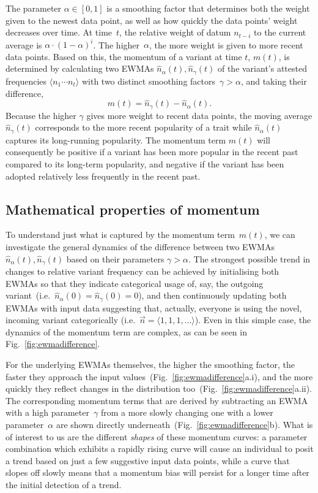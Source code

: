 \documentclass[10pt]{article}
\begin{document}
The parameter $\alpha\in[0,1]$ is a smoothing factor that determines both the weight given to the newest data point, as well as how quickly the data points' weight decreases over time. At time~$t$, the relative weight of datum $n_{t-i}$ to the current average is $\alpha\cdot(1-\alpha)^i$. The higher~$\alpha$, the more weight is given to more recent data points. Based on this, the momentum of a variant at time $t$, $m(t)$, is determined by calculating two EWMAs $\hat{n}_\alpha(t), \hat{n}_\gamma(t)$ of the variant's attested frequencies $\langle n_1\cdots n_t\rangle$ with two distinct smoothing factors~$\gamma>\alpha$, and taking their difference,
\begin{equation}
m(t) = \hat{n}_\gamma(t) - \hat{n}_\alpha(t).
\label{eq:momentum}
\end{equation}
Because the higher $\gamma$ gives more weight to recent data points, the moving average $\hat{n}_\gamma(t)$ corresponds to the more recent popularity of a trait while $\hat{n}_\alpha(t)$ captures its long-running popularity. The momentum term $m(t)$ will consequently be positive if a variant has been more popular in the recent past compared to its long-term popularity, and negative if the variant has been adopted relatively less frequently in the recent past.

\subsection{Mathematical properties of momentum}

To understand just what is captured by the momentum term~$m(t)$, we can investigate the general dynamics of the difference between two EWMAs $\hat{n}_\alpha(t), \hat{n}_\gamma(t)$ based on their parameters $\gamma>\alpha$. 
The strongest possible trend in changes to relative variant frequency can be achieved by initialising both EWMAs so that they indicate categorical usage of, say, the outgoing variant~(i.e.~$\hat{n}_\alpha(0)=\hat{n}_\gamma(0)=0$), and then continuously updating both EWMAs with input data suggesting that, actually, everyone is using the novel, incoming variant categorically (i.e.~$\vec{n}=\langle1,1,1,\ldots\rangle$). Even in this simple case, the dynamics of the momentum term are complex, as can be seen in Fig.~\ref{fig:ewmadifference}.

For the underlying EWMAs themselves, the higher the smoothing factor, the faster they approach the input values~(Fig.~\ref{fig:ewmadifference}a.i), and the more quickly they reflect changes in the distribution too~(Fig.~\ref{fig:ewmadifference}a.ii). The corresponding momentum terms that are derived by subtracting an EWMA with a high parameter~$\gamma$ from a more slowly changing one with a lower parameter~$\alpha$ are shown directly underneath~(Fig.~\ref{fig:ewmadifference}b). What is of interest to us are the different \emph{shapes} of these momentum curves: a parameter combination which exhibits a rapidly rising curve will cause an individual to posit a trend based on just a few suggestive input data points, while a curve that slopes off slowly means that a momentum bias will persist for a longer time after the initial detection of a trend.
\end{document}
